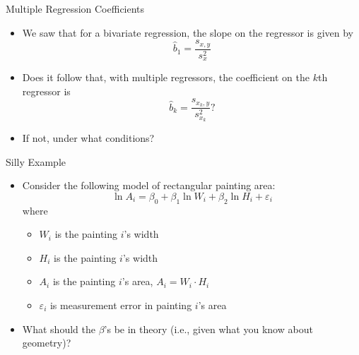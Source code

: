 

\begin{frame}{Multiple Regression Coefficients}
	\begin{itemize}
\item We saw that for a bivariate regression, the slope on the regressor is given by
\[
\hat{b}_1 =\frac{s_{x,y}}{s_{x}^{2}} 
\]

\medskip
\item Does it follow that, with multiple regressors, the coefficient on the $k$th regressor is
\[
\hat{b}_k =\frac{s_{x_{k},y}}{s_{x_{k}}^{2}} ?
\]

\medskip
\item If not, under what conditions?

\end{itemize}
\end{frame}


\begin{frame}{Silly Example}
	\begin{itemize}
	\item Consider the following model of rectangular painting area:\[
	\ln A_{i} = \beta_0 + \beta_{1} \ln W_{i} + \beta_{2} \ln H_{i} + \varepsilon_{i}
	\]
	where 
	\begin{itemize}
		\item $W_{i}$ is the painting $i$'s width
		\item $H_{i}$ is the painting $i$'s width
		\item $A_{i}$ is the painting $i$'s area, $A_{i} =W_{i} \cdot H_{i} $
		\item $\varepsilon_i$ is measurement error in painting $i$'s area
	\end{itemize}

	\medskip
	\item What should the $\beta$'s be in theory (i.e., given what you know about geometry)?
\end{itemize}
\end{frame}



